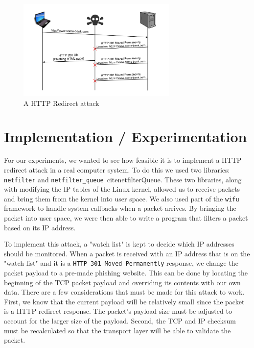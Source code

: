 \documentclass{article}
\begin{document}
\begin{figure}[t]
\begin{center}

\includegraphics[width=3.1in]{redirect_attack.png} 
\caption{A HTTP Redirect attack} 
\label{fg:attack}

\end{center}
\end{figure}

\section{Implementation / Experimentation}
For our experiments, we wanted to see how feasible it is to implement a HTTP redirect attack in a real computer system. To do this we used two libraries: \texttt{netfilter} \cite{netfilter} and \texttt{netfilter\_queue}\ cite{netfilterQueue}. These two libraries, along with modifying the IP tables of the Linux kernel, allowed us to receive packets and bring them from the kernel into user space. We also used part of the \texttt{wifu}\cite{wifu} framework to handle system callbacks when a packet arrives. By bringing the packet into user space, we were then able to write a program that filters a packet based on its IP address. 

To implement this attack, a "watch list" is kept to decide which IP addresses should be monitored. When a packet is received with an IP address that is on the "watch list" and it is a \texttt{HTTP 301 Moved Permanently} response, we change the packet payload to a pre-made phishing website. This can be done by locating the beginning of the TCP packet payload and overriding its contents with our own data. There are a few considerations that must be made for this attack to work. First, we know that the current payload will be relatively small since the packet is a HTTP redirect response. The packet's payload size must be adjusted to account for the larger size of the payload. Second, the TCP and IP checksum must be recalculated so that the transport layer will be able to validate the packet.
\end{document}
